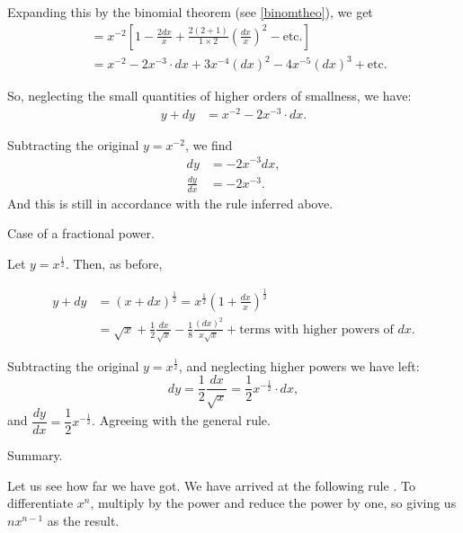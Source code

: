 \documentclass{ximera}
\begin{document}
Expanding this by the binomial theorem (see \ref{binomtheo}), we get
\begin{align*}
&=x^{-2} \left[ 1 - \frac{2dx}{x} + \frac{2(2+1)}{1 \times 2} \left(\frac{dx}{x}\right)^2 - \text{etc.}\right]  \\
&=x^{-2} - 2x^{-3} \cdot dx + 3x^{-4}(dx)^2 - 4x^{-5}(dx)^3 + \text{etc.}
\end{align*}


So, neglecting the small quantities of higher orders of smallness, we have:
\begin{align*}
       y + dy &= x^{-2} - 2x^{-3} · dx.
\end{align*}

Subtracting the original $y = x^{-2}$, we find
\begin{align*}
           dy &= -2x^{-3}dx,   \\
\frac{dy}{dx} &= -2x^{-3}.
\end{align*}
And this is still in accordance with the rule inferred above.

Case of a fractional power.

Let $y= x^{\frac{1}{2}}$. Then, as before,


\begin{align*}
y+dy &= (x+dx)^{\frac{1}{2}} = x^{\frac{1}{2}} (1 + \frac{dx}{x} )^{\frac{1}{2}} \\
     &= \sqrt{x} + \frac{1}{2} \frac{dx}{\sqrt{x}} - \frac{1}{8} \frac{(dx)^2}{x\sqrt{x}} + \text{terms with higher powers of $dx$.}
\end{align*}

Subtracting the original $y = x^{\frac{1}{2}}$, and neglecting higher
powers we have left:
\[ dy = \frac{1}{2} \frac{dx}{\sqrt{x}} = \frac{1}{2} x^{-\frac{1}{2}} · dx, \]
and $\dfrac{dy}{dx} = \dfrac{1}{2} x^{-\frac{1}{2}}$. Agreeing with the general rule.


Summary.

Let us see how far we have got. We have arrived at the following rule \label{multipow}. To differentiate $x^n$, multiply by the power and reduce the power by one, so giving us $nx^{n-1}$ as the result.

\label{ex1}
\end{document}
